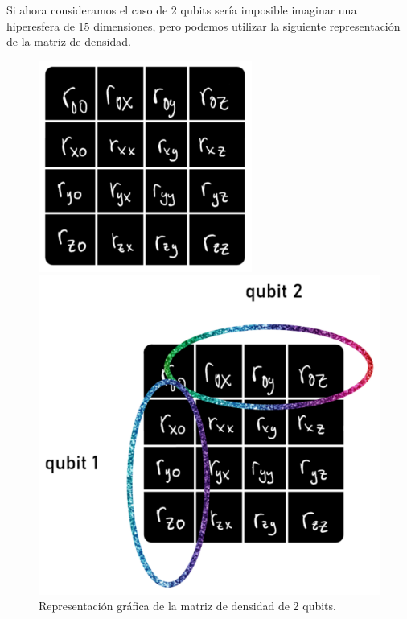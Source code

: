 \documentclass[11pt]{beamer}
\begin{document}
\begin{frame}
Si ahora consideramos el caso de 2 qubits sería imposible imaginar una
hiperesfera de 15 dimensiones, pero podemos utilizar la siguiente 
representación de la matriz de densidad.
\begin{figure}[H]
\centering
  \caption{Representación gráfica de la matriz de densidad de 2 qubits.}
  \begin{minipage}{0.5\textwidth}
  	\centering
  	\vspace{22pt}
    \includegraphics[width=0.625\textwidth]{img-congreso/rho2q.pdf}
    \vspace{20pt}
  \end{minipage}\hfill
  \begin{minipage}{0.5\textwidth}
  	\centering
    \includegraphics[width=\textwidth]{img-congreso/rho2q(1).pdf}
  \end{minipage}
\end{figure}

\end{frame}
\end{document}
